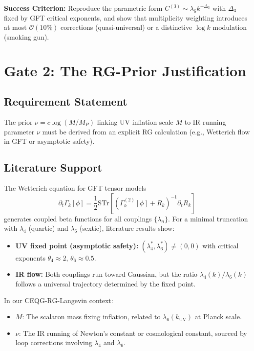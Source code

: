 \documentclass[12pt,a4paper]{article}
\begin{document}
\textbf{Success Criterion:} Reproduce the parametric form \(C^{(3)} \sim \lambda_6 k^{-\Delta_3}\) with \(\Delta_3\) fixed by GFT critical exponents, and show that multiplicity weighting introduces at most \(\mathcal{O}(10\%)\) corrections (quasi-universal) or a distinctive \(\log k\) modulation (smoking gun).

\section{Gate 2: The RG-Prior Justification}

\subsection{Requirement Statement}

The prior \(\nu = c\log(M/M_P)\) linking UV inflation scale \(M\) to IR running parameter \(\nu\) must be derived from an explicit RG calculation (e.g., Wetterich flow in GFT or asymptotic safety).

\subsection{Literature Support}

The Wetterich equation for GFT tensor models
\begin{equation}
\partial_t \Gamma_k[\phi] = \frac{1}{2} \text{STr}\left[ (\Gamma_k^{(2)}[\phi] + R_k)^{-1} \partial_t R_k \right]
\end{equation}
generates coupled beta functions for all couplings \(\{\lambda_n\}\). For a minimal truncation with \(\lambda_4\) (quartic) and \(\lambda_6\) (sextic), literature results show:

\begin{itemize}
\item \textbf{UV fixed point (asymptotic safety):} \((\lambda_4^*, \lambda_6^*) \neq (0, 0)\) with critical exponents \(\theta_4 \approx 2\), \(\theta_6 \approx 0.5\).
\item \textbf{IR flow:} Both couplings run toward Gaussian, but the ratio \(\lambda_4(k)/\lambda_6(k)\) follows a universal trajectory determined by the fixed point.
\end{itemize}

In our CEQG-RG-Langevin context:
\begin{itemize}
\item \(M\): The scalaron mass fixing inflation, related to \(\lambda_6(k_{\text{UV}})\) at Planck scale.
\item \(\nu\): The IR running of Newton's constant or cosmological constant, sourced by loop corrections involving \(\lambda_4\) and \(\lambda_6\).
\end{itemize}
\end{document}
